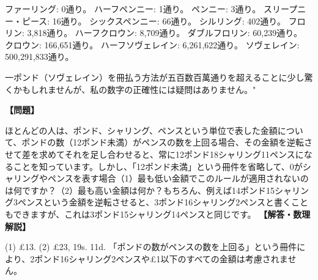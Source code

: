 \documentclass[10pt,a4paper,oneside,openany]{ltjsbook}
\begin{document}
\begin{tcolorbox}[colback=softblue,colframe=primaryblue,title=\textbf{第 32 問：THE EXCURSION TICKET PUZZLE.},arc=2mm,boxrule=1pt,breakable]
{    ファーリング: 0通り。
    ハーフペンニー: 1通り。
    ペンニー: 3通り。
    スリープニー・ピース: 16通り。
    シックスペンニー: 66通り。
    シルリング: 402通り。
    フロリン: 3,818通り。
    ハーフクロウン: 8,709通り。
    ダブルフロリン: 60,239通り。
    クロウン: 166,651通り。
    ハーフソヴェレイン: 6,261,622通り。
    ソヴェレイン: 500,291,833通り。

一ポンド（ソヴェレイン）を冊払う方法が五百数百萬通りを超えることに少し驚くかもしれませんが、私の数字の正確性には疑問はありません。"
}
\end{tcolorbox}

\begin{tcolorbox}[colback=softblue,colframe=primaryblue,title=\textbf{第 33 問：逆転によるパズル （原題: PUZZLE IN REVERSALS.）},arc=2mm,boxrule=1pt,breakable]
\textbf{【問題】}\par\vspace{0.3em}
ほとんどの人は、ポンド、シャリング、ペンスという単位で表した金額について、ポンドの数（12ポンド未満）がペンスの数を上回る場合、その金額を逆転させて差を求めてそれを足し合わせると、常に12ポンド18シャリング11ペンスになることを知っています。しかし、「12ポンド未満」という冊件を省略して、0がシャリングやペンスを表す場合（1）最も低い金額でこのルールが適用されないのは何ですか？（2）最も高い金額は何か？もちろん、例えば14ポンド15シャリング3ペンスという金額を逆転させると、3ポンド16シャリング2ペンスと書くこともできますが、これは3ポンド15シャリング14ペンスと同じです。
\tcblower
\textbf{【解答・数理解説】}\par\vspace{0.3em}
(1) £13. (2) £23, 19s. 11d. 「ポンドの数がペンスの数を上回る」という冊件により、2ポンド16シャリング2ペンスや£1以下のすべての金額は考慮されません。
\end{tcolorbox}
\end{document}
